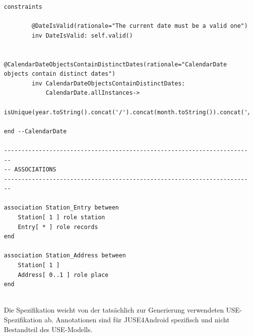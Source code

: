 \documentclass[a4paper,twoside]{article}
\begin{document}
\begin{lstlisting}[caption={Vollständige USE-Spezifikation des IceCream Modells},label=lst:completeUSE]
	constraints
	
		@DateIsValid(rationale="The current date must be a valid one")
		inv DateIsValid: self.valid()
		
		@CalendarDateObjectsContainDistinctDates(rationale="CalendarDate objects contain distinct dates")
		inv CalendarDateObjectsContainDistinctDates:
			CalendarDate.allInstances->
				isUnique(year.toString().concat('/').concat(month.toString()).concat('/').concat(day.toString()))
		
end --CalendarDate

------------------------------------------------------------------------
-- ASSOCIATIONS
------------------------------------------------------------------------
	
association Station_Entry between
	Station[ 1 ] role station
	Entry[ * ] role records
end

association Station_Address between
	Station[ 1 ] 
	Address[ 0..1 ] role place
end


\end{lstlisting}

Die Spezifikation weicht von der tatsächlich zur Generierung verwendeten USE-Spezifikation ab. Annotationen sind für JUSE4Android spezifisch und nicht Bestandteil des USE-Modells.


\twocolumn

\vfill
\end{document}
